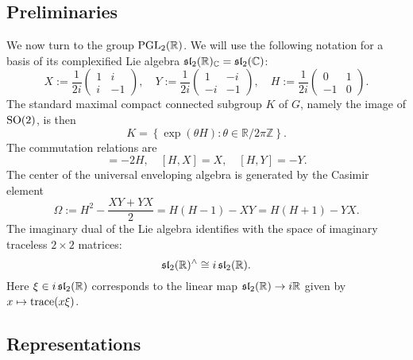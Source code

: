 \documentclass[reqno]{amsart} 
\numberwithin{equation}{section}
\numberwithin{theorem}{section}
\begin{document}
\subsection{Preliminaries}\label{sec:d1a915ba8ec6}
We now turn to the group $\operatorname{PGL}_2(\mathbb{R})$.  We will use the following notation for a basis of its complexified Lie algebra $\mathfrak{sl}_2(\mathbb{R})_{\mathbb{C}} = \operatorname{\mathfrak{s}\mathfrak{l}}_2(\mathbb{C})$:
\begin{equation*}
  X := \frac{1}{2 i}
  \begin{pmatrix}
    1 & i  \\
    i & -1
  \end{pmatrix}, \quad Y := \frac{1}{2 i}
  \begin{pmatrix}
    1  & -i \\
    -i & -1
  \end{pmatrix}, \quad H := \frac{1}{2 i}
  \begin{pmatrix}
    0  & 1 \\
    -1 & 0
  \end{pmatrix}.
\end{equation*}
The standard maximal compact connected subgroup $K$ of $G$, namely the image of $\operatorname{SO}(2)$, is then
\begin{equation*}
  K = \left\{ \exp(\theta H) : \theta \in \mathbb{R} / 2 \pi \mathbb{Z}  \right\}.
\end{equation*}
The commutation relations are
\begin{equation*}
  [X,Y] = - 2 H,  \quad
  [H,X] = X,
  \quad
  [H,Y] = -Y.
\end{equation*}
The center of the universal enveloping algebra is generated by the Casimir element
\begin{equation*}
  \Omega := H^2 - \frac{X Y + Y X}{2} = H(H-1) - X Y = H(H+1) - Y X.
\end{equation*}
The imaginary dual of the Lie algebra identifies with the space of imaginary traceless $2 \times 2$ matrices:
\begin{equation}\label{eqn:d1a9150ab652}
\operatorname{\mathfrak{s}\mathfrak{l}}_2(\mathbb{R})^\wedge \cong i \operatorname{\mathfrak{s}\mathfrak{l}}_2(\mathbb{R}).
\end{equation}
Here $\xi \in i \operatorname{\mathfrak{s}\mathfrak{l}}_2(\mathbb{R})$ corresponds to the linear map $\operatorname{\mathfrak{s}\mathfrak{l}}_2(\mathbb{R}) \rightarrow i \mathbb{R} $ given by $x \mapsto \operatorname{trace}(x \xi)$.


\subsection{Representations}\label{sec:d1a915c57e2f}
\end{document}
